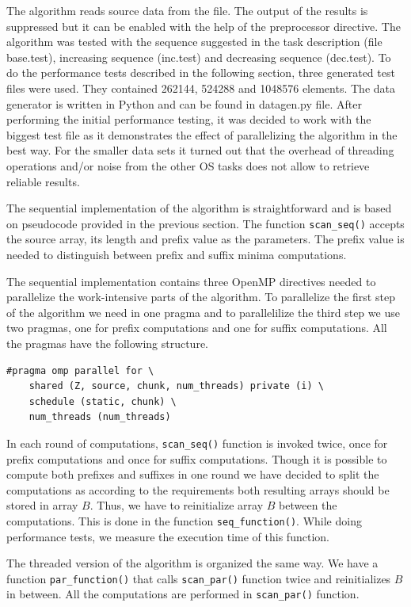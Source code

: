 \documentclass[a4paper,10pt,notitlepage]{article}
\begin{document}
The algorithm reads source data from the file. The output of the results is suppressed but it can be enabled with the help of the preprocessor directive. The algorithm was tested with the sequence suggested in the task description (file base.test), increasing sequence (inc.test) and decreasing sequence (dec.test). To do the performance tests described in the following section, three generated test files were used. They contained 262144, 524288 and 1048576 elements. The data generator is written in Python and can be found in datagen.py file. After performing the initial performance testing, it was decided to work with the biggest test file as it demonstrates the effect of parallelizing the algorithm in the best way. For the smaller data sets it turned out that the overhead of threading operations and/or noise from the other OS tasks does not allow to retrieve reliable results.

The sequential implementation of the algorithm is straightforward and is based on pseudocode provided in the previous section. The function \lstinline{scan_seq()} accepts the source array, its length and prefix value as the parameters. The prefix value is needed to distinguish between prefix and suffix minima computations. 

The sequential implementation contains three OpenMP directives needed to parallelize the work-intensive parts of the algorithm. To parallelize the first step of the algorithm we need in one pragma and to parallelilize the third step we use two pragmas, one for prefix computations and one for suffix computations. All the pragmas have the following structure.

\begin{lstlisting}
#pragma omp parallel for \
	shared (Z, source, chunk, num_threads) private (i) \
	schedule (static, chunk) \
	num_threads (num_threads)
\end{lstlisting}

In each round of computations, \lstinline{scan_seq()} function is invoked twice, once for prefix computations and once for suffix computations. Though it is possible to compute both prefixes and suffixes in one round we have decided to split the computations as according to the requirements both resulting arrays should be stored in array $B$. Thus, we have to reinitialize array $B$ between the computations. This is done in the function \lstinline{seq_function()}. While doing performance tests, we measure the execution time of this function.

The threaded version of the algorithm is organized the same way. We have a function \lstinline{par_function()} that calls \lstinline{scan_par()} function twice and reinitializes $B$ in between. All the computations are performed in \lstinline{scan_par()} function. 
\end{document}
